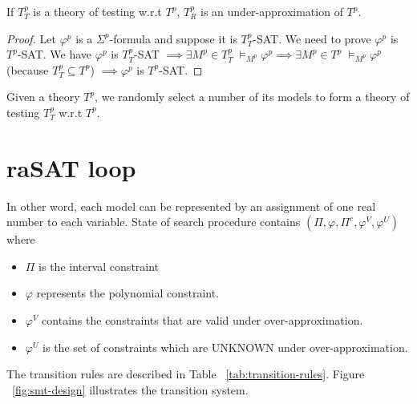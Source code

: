 \begin{theorem}
If $T^p_T$ is a theory of testing w.r.t $T^p$, $T^p_R$ is an under-approximation of $T^p$.
\end{theorem}

\begin{proof}
Let $\varphi^p$ is a $\Sigma^p$-formula and suppose it is $T^p_T$-SAT. We need to prove $\varphi^p$ is $T^p$-SAT. We have $\varphi^p$ is $T^p_T$-SAT $\implies \exists M^p \in T^p_T \; \models_{M^p} \varphi^p \implies \exists M^p \in T^p \; \models_{M^p} \varphi^p$ (because $T^p_T \subseteq T^p$) $\implies \varphi^p$ is $T^p$-SAT.
\end{proof}

Given a theory $T^p$, we randomly select a number of its models to form a theory of testing $T^p_T$ w.r.t $T^p$.

\section{raSAT loop}
In other word, each model can be represented by an assignment of one real number to each variable. 
State of search procedure contains  $(\Pi, \varphi, \Pi^c, \varphi^V, \varphi^U)$ where 
\begin{itemize}
\item $\Pi$ is the interval constraint
\item $\varphi$ represents the polynomial constraint.
\item $\varphi^V$ contains the constraints that are valid under over-approximation.
\item $\varphi^U$ is the set of constraints which are UNKNOWN under over-approximation.
\end{itemize}
The transition rules are described in Table ~\ref{tab:transition-rules}. Figure ~\ref{fig:smt-design} illustrates the transition system. 


